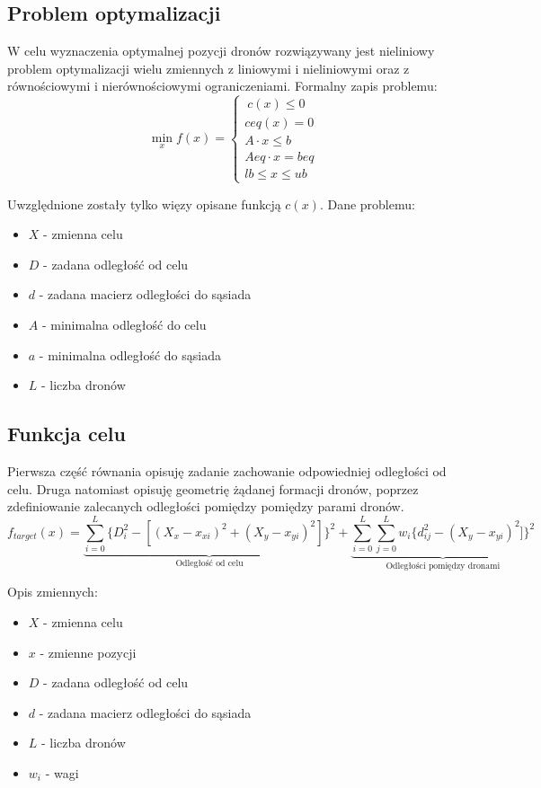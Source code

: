 \documentclass[a4paper, 11pt, oneside]{article}
\begin{document}
\subsection{Problem optymalizacji}
W celu wyznaczenia optymalnej pozycji dronów rozwiązywany jest nieliniowy problem optymalizacji wielu zmiennych z liniowymi i nieliniowymi oraz z równościowymi i nierównościowymi ograniczeniami. Formalny zapis problemu:
\begin{equation}
\operatorname*{min}_x  f(x)=
	\begin{cases}
	\ c(x) \leq 0
	\\
	ceq(x)=0
	\\
	A \cdot x\leq b
	\\
	Aeq \cdot x =beq
	\\
	lb \leq x \leq ub
	\end{cases}
\end{equation}

Uwzględnione zostały tylko więzy opisane funkcją $c(x)$.
Dane problemu:
\begin{itemize}
\item $X$ - zmienna celu
\item $D$ - zadana odległość od celu
\item $d$ - zadana macierz odległości do sąsiada
\item $A$  - minimalna odległość do celu
\item $a$ -  minimalna odległość do sąsiada
\item $L$ - liczba dronów
\end{itemize}
\subsection{Funkcja celu}
Pierwsza część równania opisuję zadanie zachowanie odpowiedniej odległości od celu. Druga natomiast opisuję geometrię żądanej  formacji dronów, poprzez zdefiniowanie zalecanych odległości pomiędzy  pomiędzy parami dronów.
\begin{equation}
f_{target}(x)= \underbrace{\sum_{i=0}^{L}\lbrace D_i^2 - [(X_x -x_{xi})^2+(X_y -x_{yi})^2] \rbrace ^2}_\text{Odległość od celu} +
\underbrace{\sum_{i=0}^{L}\sum_{j=0}^{L}w_i\lbrace d_{ij}^2 -(X_y -x_{yi})^2]\rbrace ^2}_\text{Odległości pomiędzy dronami}
\end{equation}

Opis zmiennych:
\begin{itemize}
\item $X$ - zmienna celu
\item $x$ - zmienne pozycji 
\item $D$ - zadana odległość od celu
\item $d$ - zadana macierz odległości do sąsiada
\item $L$ - liczba dronów
\item $w_i$ - wagi
\end{itemize}
\end{document}
